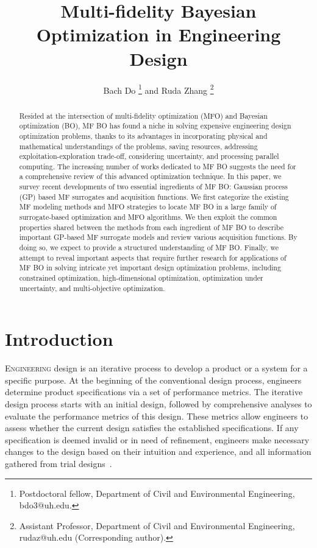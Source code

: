 \documentclass[journal ]{new-aiaa}
\title{Multi-fidelity Bayesian Optimization in Engineering Design}
\author{Bach Do \footnote{Postdoctoral fellow, Department of Civil and Environmental Engineering, bdo3@uh.edu.} and Ruda Zhang \footnote{Assistant Professor, Department of Civil and Environmental Engineering, rudaz@uh.edu (Corresponding author).}}
\affil{University of Houston, Houston, TX 77204-4003, USA}
\begin{document}
	
	\maketitle
	
	\begin{abstract}
		Resided at the intersection of multi-fidelity optimization (MFO) and Bayesian optimization (BO), MF BO has found a niche in solving expensive engineering design optimization problems, thanks to its advantages in incorporating physical and mathematical understandings of the problems, saving resources, addressing exploitation-exploration trade-off, considering uncertainty, and processing parallel computing.
		The increasing number of works dedicated to MF BO suggests the need for a comprehensive review of this advanced optimization technique.   
		In this paper, we survey recent developments of two essential ingredients of MF BO: Gaussian process (GP) based MF surrogates and acquisition functions.
		We first categorize the existing MF modeling methods and MFO strategies to locate MF BO in a large family of surrogate-based optimization and MFO algorithms.
		We then exploit the common properties shared between the methods from each ingredient of MF BO to describe important GP-based MF surrogate models and review various acquisition functions.
		By doing so, we expect to provide a structured understanding of MF BO.
		Finally, we attempt to reveal important aspects that require further research for applications of MF BO in solving intricate yet important design optimization problems, including constrained optimization, high-dimensional optimization, optimization under uncertainty, and multi-objective optimization.
	\end{abstract}
	
	\tableofcontents
	
	\section{Introduction}\label{Sec1}
	\lettrine{E}{ngineering} design is an iterative process to develop a product or a system for a specific purpose.
	At the beginning of the conventional design process, engineers determine product specifications via a set of performance metrics.
	The iterative design process starts with an initial design, followed by comprehensive analyses to evaluate the performance metrics of this design.
	These metrics allow engineers to assess whether the current design satisfies the established specifications.
	If any specification is deemed invalid or in need of refinement, engineers make necessary changes to the design based on their intuition and experience, and all information gathered from trial designs~\cite{Arora2016}.
	
\end{document}
